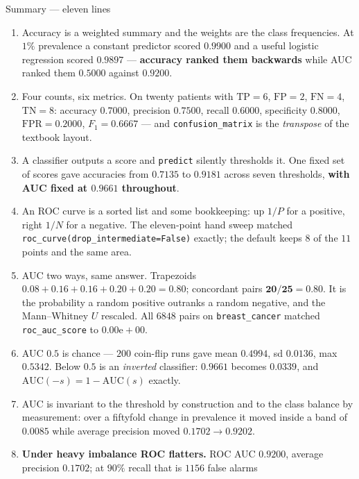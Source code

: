 \documentclass[aspectratio=169]{beamer}
\newcommand{\TP}{\mathrm{TP}}
\newcommand{\FP}{\mathrm{FP}}
\newcommand{\TN}{\mathrm{TN}}
\newcommand{\FN}{\mathrm{FN}}
\newcommand{\FPR}{\mathrm{FPR}}
\begin{document}
\begin{frame}[shrink=17]{Summary --- eleven lines}
  \begin{enumerate}\small
    \item Accuracy is a weighted summary and the weights are the class
      frequencies. At $1\%$ prevalence a constant predictor scored
      $\mathbf{0.9900}$ and a useful logistic regression scored
      $\mathbf{0.9897}$ --- \textbf{accuracy ranked them backwards} while AUC
      ranked them $0.5000$ against $0.9200$.
    \item Four counts, six metrics. On twenty patients with $\TP = 6$,
      $\FP = 2$, $\FN = 4$, $\TN = 8$: accuracy $0.7000$, precision $0.7500$,
      recall $0.6000$, specificity $0.8000$, $\FPR = 0.2000$,
      $F_1 = 0.6667$ --- and \texttt{confusion\_matrix} is the
      \emph{transpose} of the textbook layout.
    \item A classifier outputs a score and \texttt{predict} silently
      thresholds it. One fixed set of scores gave accuracies from $0.7135$ to
      $0.9181$ across seven thresholds, \textbf{with AUC fixed at $0.9661$
      throughout}.
    \item An ROC curve is a sorted list and some bookkeeping: up $1/P$ for a
      positive, right $1/N$ for a negative. The eleven-point hand sweep
      matched \texttt{roc\_curve(drop\_intermediate=False)} exactly; the
      default keeps $8$ of the $11$ points and the same area.
    \item AUC two ways, same answer. Trapezoids
      $0.08 + 0.16 + 0.16 + 0.20 + 0.20 = \mathbf{0.80}$; concordant pairs
      $\mathbf{20/25 = 0.80}$. It is the probability a random positive
      outranks a random negative, and the Mann--Whitney $U$ rescaled. All
      $6848$ pairs on \texttt{breast\_cancer} matched \texttt{roc\_auc\_score}
      to $0.00\mathrm{e}{+}00$.
    \item AUC $0.5$ is chance --- $200$ coin-flip runs gave mean $0.4994$,
      sd $0.0136$, max $0.5342$. Below $0.5$ is an \emph{inverted} classifier:
      $0.9661$ becomes $0.0339$, and $\mathrm{AUC}(-s) = 1 - \mathrm{AUC}(s)$
      exactly.
    \item AUC is invariant to the threshold by construction and to the class
      balance by measurement: over a fiftyfold change in prevalence it moved
      inside a band of $0.0085$ while average precision moved
      $0.1702 \to 0.9202$.
    \item \textbf{Under heavy imbalance ROC flatters.} ROC AUC $0.9200$,
      average precision $0.1702$; at $90\%$ recall that is $1156$ false alarms

\end{enumerate}
\end{frame}
\end{document}
